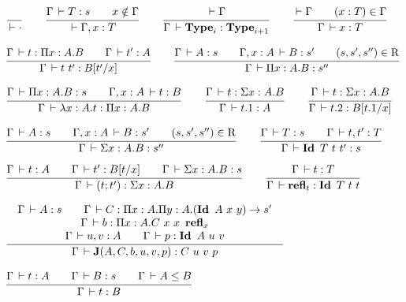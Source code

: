 \documentclass[a4paper,english]{lipics-utf8x}
\begin{document}
  \begin{center}
  \(
    \ru{}{\der \cdot}
    \qquad
    \ru{\Gamma \der T : s \qquad
        x \notin \Gamma
      }{\der \Gamma, x : T}
    \qquad
    \ru{\der \Gamma
      }{\Gamma \der \Type_i : \Type_{i+1}}
    \qquad
    \ru{\der \Gamma \qquad
        (x : T) \in \Gamma
      }{\Gamma \der x : T}
  \)
  \end{center}

  \begin{center}
  \(
    \ru{\Gamma \der t : \Pi x:A.B \qquad
        \Gamma \der t' : A
      }{\Gamma \der t\ t' : B[t'/x]}
    \qquad
    \ru{\Gamma \der A : s \qquad
        \Gamma, x:A \der B : s' \qquad
        (s,s',s'') \in \R
      }{\Gamma \der \Pi x:A.B : s''}
  \)
  \end{center}

  \begin{center}
  \(
    \ru{\Gamma \der \Pi x:A.B : s \qquad
        \Gamma, x:A \der t : B
      }{\Gamma \der \lambda x:A.t : \Pi x:A.B}
    \qquad
    \ru{\Gamma \der t : \Sigma x:A.B
      }{\Gamma \der t.1 : A}
    \qquad
    \ru{\Gamma \der t : \Sigma x:A.B
      }{\Gamma \der t.2 : B[t.1/x]}
  \)
  \end{center}

  \begin{center}
  \(
    \ru{\Gamma \der A : s \qquad
        \Gamma, x:A \der B : s' \qquad
        (s,s',s'') \in \R
      }{\Gamma \der \Sigma x:A.B : s''}
    \qquad
    \ru{\Gamma \der T : s \qquad
        \Gamma \der t,t' : T
      }{\Gamma \der \Id T\ t\ t' : s}
  \)
  \end{center}

  \begin{center}
  \(
    \ru{\Gamma \der t : A \qquad
        \Gamma \der t' : B[t/x] \qquad
        \Gamma \der \Sigma x:A.B : s
      }{\Gamma \der (t;t') : \Sigma x:A.B}
    \qquad
    \ru{\Gamma \der t : T
      }{\Gamma \der \refl_t : \Id T\ t\ t}
  \)
  \end{center}

  \begin{center}
  \(
    \tru{\Gamma \der A : s \qquad
         \Gamma \der C : \Pi x:A. \Pi y:A. (\Id A\ x\ y) \to s'
       }{\Gamma \der b : \Pi x:A. C\ x\ x\ \refl_x
       }{\Gamma \der u, v : A \qquad
         \Gamma \der p : \Id A\ u\ v
       }{\Gamma \der \J (A,C,b,u,v,p) : C\ u\ v\ p}
  \)
  \end{center}

  \begin{center}
  \(
    \ru{\Gamma \der t : A \qquad
        \Gamma \der B : s \qquad
        \Gamma \der A \le B
      }{\Gamma \der t : B}
  \)
  \end{center}
\end{document}

